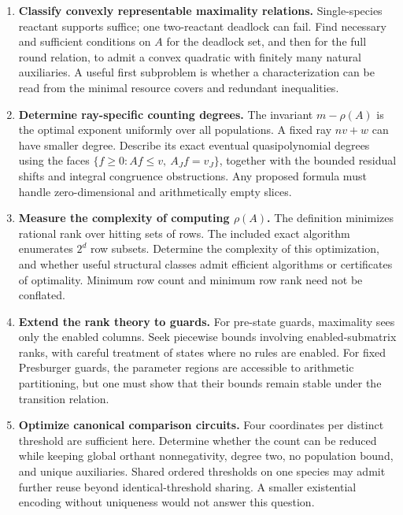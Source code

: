 \documentclass[11pt,letterpaper]{article}
\theoremstyle{definition}
\theoremstyle{remark}
\begin{document}
\begin{enumerate}[label=\textbf{Q\arabic*.},leftmargin=3.0em]
\item \textbf{Classify convexly representable maximality relations.}
Single-species reactant supports suffice; one two-reactant deadlock can
fail. Find necessary and sufficient conditions on $A$ for the deadlock
set, and then for the full round relation, to admit a convex quadratic
with finitely many natural auxiliaries. A useful first subproblem is
whether a characterization can be read from the minimal resource covers
and redundant inequalities.

\item \textbf{Determine ray-specific counting degrees.}
The invariant $m-\rho(A)$ is the optimal exponent uniformly over all
populations. A fixed ray $nv+w$ can have smaller degree. Describe its
exact eventual quasipolynomial degrees using the faces
$\{f\ge0:Af\le v,\ A_Jf=v_J\}$, together with the bounded residual shifts
and integral congruence obstructions. Any proposed formula must handle
zero-dimensional and arithmetically empty slices.

\item \textbf{Measure the complexity of computing $\rho(A)$.}
The definition minimizes rational rank over hitting sets of rows. The
included exact algorithm enumerates $2^d$ row subsets. Determine the
complexity of this optimization, and whether useful structural classes
admit efficient algorithms or certificates of optimality. Minimum row
count and minimum row rank need not be conflated.

\item \textbf{Extend the rank theory to guards.}
For pre-state guards, maximality sees only the enabled columns. Seek
piecewise bounds involving enabled-submatrix ranks, with careful treatment
of states where no rules are enabled. For fixed Presburger guards, the
parameter regions are accessible to arithmetic partitioning, but one must
show that their bounds remain stable under the transition relation.

\item \textbf{Optimize canonical comparison circuits.}
Four coordinates per distinct threshold are sufficient here. Determine
whether the count can be reduced while keeping global orthant
nonnegativity, degree two, no population bound, and unique auxiliaries.
Shared ordered thresholds on one species may admit further reuse beyond
identical-threshold sharing. A smaller existential encoding without
uniqueness would not answer this question.


\end{enumerate}
\end{document}
